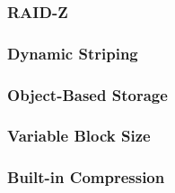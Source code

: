% 
% 
\begin{frame}[fragile]
    \frametitle{RAID-Z}
\end{frame}
% 
% 
% 
% 
\begin{frame}[fragile]
    \frametitle{Dynamic Striping}
\end{frame}
% 
% 
% 
\begin{frame}[fragile]
    \frametitle{Object-Based Storage}
\end{frame}
% 
% 
% 
% 
\begin{frame}[fragile]
    \frametitle{Variable Block Size}
\end{frame}
% 
% 
% 
\begin{frame}[fragile]
    \frametitle{Built-in Compression}
\end{frame}
% 
% 
% 

